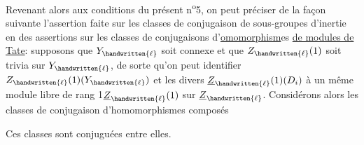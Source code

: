 Revenant alors aux conditions du présent n\textsuperscript{o}5, on peut préciser de la façon suivante l'assertion faite sur les  classes de conjugaison de sous-groupes d'inertie en des assertions sur les classes de conjugaisons d'\uline{omomorphism}es \uline{de modules de Tate}: supposons que $Y_{\handwritten{\ell}}$ soit connexe et que $Z_{\handwritten{\ell}}(1)$ soit trivia sur $Y_{\handwritten{\ell}}$,  de sorte qu'on peut identifier $Z_{\handwritten{\ell}}(1)(Y_{\handwritten{\ell}})$ et les divers $\underline{Z}_{\handwritten{\ell}}(1)(D_i)$ à un même module \handwritten{(}libre de rang 1\handwritten{)}$\underline{Z}_{\handwritten{\ell}}(1)$ sur $\underline{Z}_{\handwritten{\ell}}$. Considérons alors les classes de conjugaison d'homomorphismes composés

Ces classes sont conjuguées entre elles.
